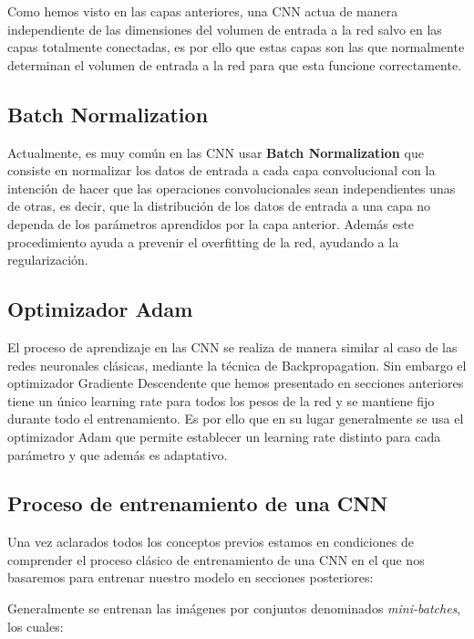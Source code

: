             \medskip

            \noindent Como hemos visto en las capas anteriores, una CNN actua de manera independiente de las dimensiones del volumen de entrada a la red salvo en las capas totalmente conectadas, es por ello que estas capas son las que normalmente determinan el volumen de entrada a la red para que esta funcione correctamente.

        \subsection{Batch Normalization}
            \noindent Actualmente, es muy común en las CNN usar \textbf{Batch Normalization} que consiste en normalizar los datos de entrada a cada capa convolucional con la intención de hacer que las operaciones convolucionales sean independientes unas de otras, es decir, que la distribución de los datos de entrada a una capa no dependa de los parámetros aprendidos por la capa anterior. Además este procedimiento ayuda a prevenir el overfitting de la red, ayudando a la regularización.

        \subsection{Optimizador Adam}
            El proceso de aprendizaje en las CNN se realiza de manera similar al caso de las redes neuronales clásicas, mediante la técnica de Backpropagation. Sin embargo el optimizador Gradiente Descendente que hemos presentado en secciones anteriores tiene un único learning rate para todos los pesos de la red y se mantiene fijo durante todo el entrenamiento. Es por ello que en su lugar generalmente se usa el optimizador Adam que permite establecer un learning rate distinto para cada parámetro y que además es adaptativo.

        \subsection{Proceso de entrenamiento de una CNN}

            \noindent Una vez aclarados todos los conceptos previos estamos en condiciones de comprender el proceso clásico de entrenamiento de una CNN en el que nos basaremos para entrenar nuestro modelo en secciones posteriores: 

            \medskip

            \noindent Generalmente se entrenan las imágenes por conjuntos denominados \textit{mini-batches}, los cuales: 

